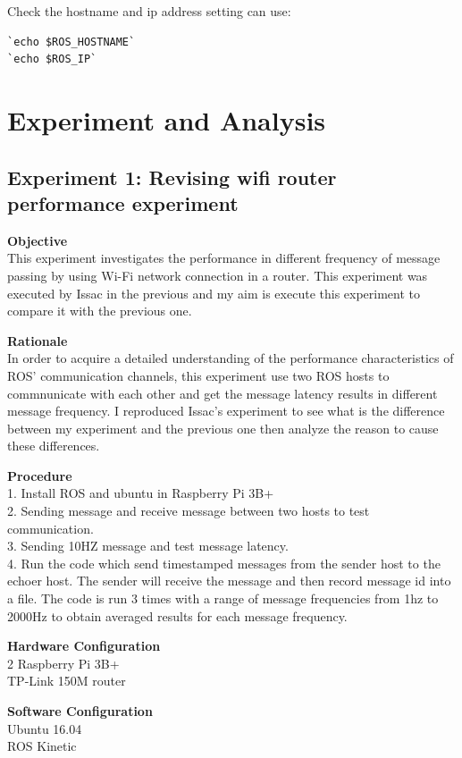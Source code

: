 \documentclass{mproj}
\begin{document}
Check the hostname and ip address setting can use:
\begin{verbatim}
`echo $ROS_HOSTNAME`
`echo $ROS_IP`
\end{verbatim}

\chapter{Experiment and Analysis}

\section{Experiment 1: Revising wifi router performance experiment}
\textbf{Objective} \\
This experiment investigates the performance in different frequency of message passing by using Wi-Fi network connection in a router.  This experiment was executed by Issac in the previous and my aim is execute this experiment to compare it with the previous one.

\textbf{Rationale} \\
In order to acquire a detailed understanding of the performance characteristics of ROS’ communication channels, this experiment use two ROS hosts to commnunicate with each other and get the message latency results in different message frequency. I reproduced Issac's experiment to see what is the difference between my experiment and the previous one then analyze the reason to cause these differences.

\textbf{Procedure} \\
1. Install ROS and ubuntu in Raspberry Pi 3B+ \\
2. Sending message and receive message between two hosts to test communication. \\
3. Sending 10HZ message and test message latency. \\
4. Run the code which send timestamped messages from the sender host to the echoer host. The sender will receive the message and then record message id into a file. The code is run 3 times with a range of message frequencies from 1hz to 2000Hz to obtain averaged results for each message frequency.

\textbf{Hardware Configuration} \\
2 Raspberry Pi 3B+ \\
TP-Link 150M router

\textbf{Software Configuration} \\
Ubuntu 16.04 \\
ROS Kinetic 
\end{document}
